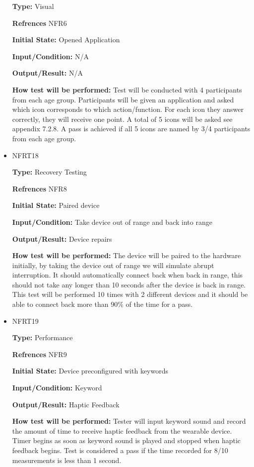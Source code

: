 \documentclass[12pt, titlepage]{article}
\begin{document}
\begin{itemize}
\textbf{Type:} Visual

\textbf{Refrences} NFR6
					
\textbf{Initial State:} Opened Application
					
\textbf{Input/Condition:} N/A
					
\textbf{Output/Result:} N/A
					
\textbf{How test will be performed:} Test will be conducted with 4 participants from each age group. Participants will be given an application and asked which icon corresponds to which action/function. For each icon they answer correctly, they will receive one point. A total of 5 icons will be asked see appendix 7.2.8. A pass is achieved if all 5 icons are named by 3/4 participants from each age group.

\item{NFRT18}

\textbf{Type:} Recovery Testing

\textbf{Refrences} NFR8
					
\textbf{Initial State:} Paired device
					
\textbf{Input/Condition:} Take device out of range and back into range
					
\textbf{Output/Result:} Device repairs
					
\textbf{How test will be performed:} The device will be paired to the hardware initially, by taking the device out of range we will simulate abrupt interruption. It should automatically connect back when back in range, this should not take any longer than 10 seconds after the device is back in range. This test will be performed 10 times with 2 different devices and it should be able to connect back more than 90\% of the time for a pass.

\item{NFRT19}

\textbf{Type:} Performance

\textbf{Refrences} NFR9
					
\textbf{Initial State:} Device preconfigured with keywords
					
\textbf{Input/Condition:} Keyword
					
\textbf{Output/Result:} Haptic Feedback
					
\textbf{How test will be performed:} Tester will input keyword sound and record the amount of time to receive haptic feedback from the wearable device. Timer begins as soon as keyword sound is played and stopped when haptic feedback begins. Test is considered a pass if the time recorded for 8/10 measurements is less than 1 second.


\end{itemize}
\end{document}
